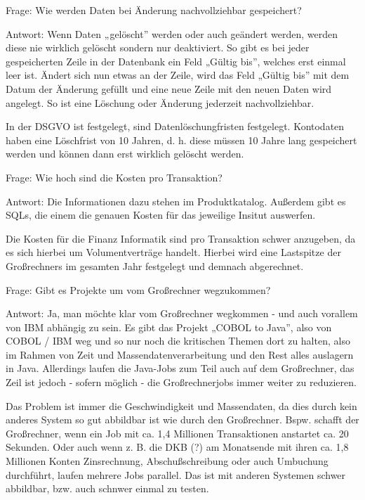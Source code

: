 \bigbreak
\bigbreak

Frage:
Wie werden Daten bei Änderung nachvollziehbar gespeichert?

\bigbreak

Antwort:
Wenn Daten „gelöscht” werden oder auch geändert werden, werden diese nie wirklich gelöscht sondern nur deaktiviert.
So gibt es bei jeder gespeicherten Zeile in der Datenbank ein Feld „Gültig bis”, welches erst einmal leer ist. 
Ändert sich nun etwas an der Zeile, wird das Feld „Gültig bis” mit dem Datum der Änderung gefüllt und eine neue Zeile mit den neuen Daten wird angelegt.
So ist eine Löschung oder Änderung jederzeit nachvollziehbar.

\noindent
In der DSGVO ist festgelegt, sind Datenlöschungfristen festgelegt.
Kontodaten haben eine Löschfrist von 10 Jahren, d. h. diese müssen 10 Jahre lang gespeichert werden und können dann erst wirklich gelöscht werden.

\bigbreak
\bigbreak

Frage:
Wie hoch sind die Kosten pro Transaktion?

\bigbreak
Antwort: 
Die Informationen dazu stehen im Produktkatalog. Außerdem gibt es SQLs, die einem die genauen Kosten für das jeweilige Insitut auswerfen.

\noindent
Die Kosten für die Finanz Informatik sind pro Transaktion schwer anzugeben, da es sich hierbei um Volumentverträge handelt. 
Hierbei wird eine Lastspitze der Großrechners im gesamten Jahr festgelegt und demnach abgerechnet. 


\bigbreak
\bigbreak

Frage:
Gibt es Projekte um vom Großrechner wegzukommen?

\bigbreak

Antwort:
Ja, man möchte klar vom Großrechner wegkommen - und auch vorallem von IBM abhängig zu sein.
Es gibt das Projekt „COBOL to Java”, also von COBOL / IBM weg und so nur noch die kritischen Themen dort zu halten, also im Rahmen von Zeit und Massendatenverarbeitung und den Rest alles auslagern in Java.
Allerdings laufen die Java-Jobs zum Teil auch auf dem Großrechner, das Zeil ist jedoch - sofern möglich - die Großrechnerjobs immer weiter zu reduzieren.

\noindent
Das Problem ist immer die Geschwindigkeit und Massendaten, da dies durch kein anderes System so gut abbildbar ist wie durch den Großrechner.
Bspw. schafft der Großrechner, wenn ein Job mit ca. 1,4 Millionen Transaktionen anstartet ca. 20 Sekunden.
Oder auch wenn z. B. die DKB (?) am Monatsende mit ihren ca. 1,8 Millionen Konten Zinsrechnung, Abschußschreibung oder auch Umbuchung durchführt, laufen mehrere Jobs parallel.
Das ist mit anderen Systemen schwer abbildbar, bzw. auch schnwer einmal zu testen.

